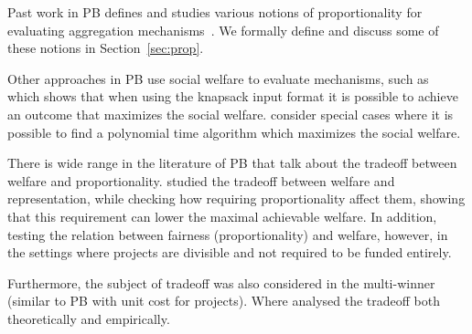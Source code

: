 \documentclass[runningheads]{llncs}
\newcommand{\kibitz}[2]{\ifnum\Comments=1{\color{#1}{#2}}\fi}
\newcommand{\rmr}[1]{\kibitz{red}{[Reshef says:#1]}}
\newcommand{\rf}[1]{\kibitz{blue}{[Roy says:#1]}}
\begin{document}
Past work in PB defines and studies various notions of proportionality for evaluating aggregation mechanisms~\cite{peters2020proportional, fain2016core, fain2018fair, aziz2017proportionally, aziz2017justified, sanchez2017proportional, skowron2020participatory}. We formally define and discuss some of these notions in Section~\ref{sec:prop}.

Other approaches in PB use  social welfare to evaluate mechanisms, such as  ~\citet{goel2019knapsack} which shows that when using the  knapsack input format  it is possible to achieve an outcome that maximizes the social welfare.
 \citet{jain2020participatory} consider special cases where it is possible to find a polynomial time algorithm which maximizes the social welfare. 

There is wide range in the literature of PB that talk about the tradeoff between welfare and proportionality. \citet{fairstein2022welfare} studied the tradeoff between welfare and representation, while checking how requiring proportionality affect them, showing that this requirement can lower the maximal achievable welfare. In addition, \citet{michorzewski2020price} testing the relation between fairness (proportionality) and welfare, however, in the settings where projects are divisible and not required to be funded entirely.

Furthermore, the subject of tradeoff was also considered in the multi-winner (similar to PB with unit cost for projects). Where \citet{lackner2020utilitarian, skowron2021proportionality} analysed the tradeoff both theoretically and empirically.

\rmr{I can think of at least one paper that studies this tradeoff in PB... don't you think it should be cited?? also describe the most relevant results, and return to them in the conclusion}\rf{rewrote the paragraph - look at the two paragraphs above the comment}
\end{document}
